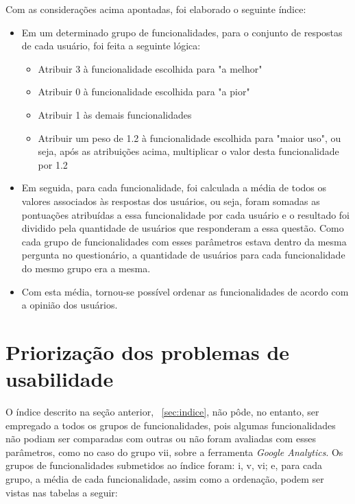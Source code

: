     Com as considerações acima apontadas, foi elaborado o seguinte índice:
    \begin{itemize}
    \item 
    Em um determinado grupo de funcionalidades, para o conjunto de respostas de cada usuário, foi feita a seguinte lógica:
    
        \begin{itemize}
        \item  
        Atribuir 3 à funcionalidade escolhida para "a melhor"
        \item
        Atribuir 0 à funcionalidade escolhida para "a pior"
        \item
        Atribuir 1 às demais funcionalidades
        \item
        Atribuir um peso de 1.2 à funcionalidade escolhida para "maior uso", ou seja, após as atribuições acima, multiplicar o valor desta funcionalidade por 1.2
        \end{itemize}
    \item 
    Em seguida, para cada funcionalidade, foi calculada a média de todos os valores associados às respostas dos usuários, ou seja, foram somadas as pontuações atribuídas a essa funcionalidade por cada usuário e o resultado foi dividido pela quantidade de usuários que responderam a essa questão. Como cada grupo de funcionalidades com esses parâmetros estava dentro da mesma pergunta no questionário, a quantidade de usuários para cada funcionalidade do mesmo grupo era a mesma.
    \item 
    Com esta média, tornou-se possível ordenar as funcionalidades de acordo com a opinião dos usuários.
    \end{itemize}
    
    
\section{Priorização dos problemas de usabilidade}
\label{sec:priorizacao}

    O índice descrito na seção anterior, ~\ref{sec:indice}, não pôde, no entanto, ser empregado a todos os grupos de funcionalidades, pois algumas funcionalidades não podiam ser comparadas com outras ou não foram avaliadas com esses parâmetros, como no caso do grupo vii, sobre a ferramenta \emph{Google Analytics}. Os grupos de funcionalidades submetidos ao índice foram: i, v, vi; e, para cada grupo, a média de cada funcionalidade, assim como a ordenação, podem ser vistas nas tabelas a seguir:

